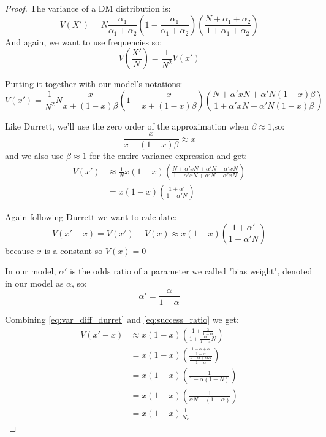 \documentclass[12pt]{extarticle}
\begin{document}
\begin{proof}
The variance of a DM distribution is:
\begin{equation}
V(X') = N\frac{\alpha_1}{\alpha_1+\alpha_2}(1-\frac{\alpha_1}{\alpha_1+\alpha_2})
(\frac{N + \alpha_1+\alpha_2}{1+\alpha_1+\alpha_2})
\end{equation}
And again, we want to use frequencies so:
\begin{equation}
V(\frac{X'}{N}) = \frac{1}{N^2}V(x')
\end{equation}

Putting it together with our model's notations:
\begin{equation}
V(x') = \frac{1}{N^2}N\frac{x}{x+(1-x)\beta}(1-\frac{x}{x+(1-x)\beta})
(\frac{N + \alpha' xN + \alpha' N(1-x)\beta}{1 + \alpha' xN + \alpha' N(1-x)\beta}) 
\end{equation}

Like Durrett, we'll use the zero order of the approximation when $\beta\approx1$,so:
\begin{equation}
\frac{x}{x + (1-x)\beta} \approx x
\end{equation}
and we also use $\beta\approx1$ for the entire variance expression and get:
\begin{equation}
\begin{split}
V(x') & \approx  \frac{1}{N} x(1-x)
(\frac{N + \alpha' xN + \alpha' N - \alpha' xN}{1 + \alpha' xN + \alpha' N - \alpha' xN})\\
&=  x(1-x)(\frac{1 + \alpha'}{1 + \alpha' N}) 
\end{split}
\end{equation}

Again following Durrett we want to calculate:
\begin{equation}\label{eq:var_diff_durret}
V(x'-x) = V(x') - V(x) \approx  x(1-x)(\frac{1 + \alpha'}{1 + \alpha' N})
\end{equation}
because $x$ is a constant so $V(x) = 0$

In our model, $\alpha'$ is the odds ratio of a parameter we called "bias weight", denoted in our model as $\alpha$, so:
\begin{equation}\label{eq:success_ratio}
\alpha' = \frac{\alpha}{1-\alpha}
\end{equation}

Combining \cref{eq:var_diff_durret} and \cref{eq:success_ratio} we get:
\begin{equation}\label{eq:const_var}
\begin{split}
V(x'-x) & \approx x(1-x)(\frac{1 + \frac{\alpha}{1-\alpha}}{1 + \frac{\alpha}{1-\alpha} N})\\
 &= x(1-x)(\frac{\frac{1-\alpha+\alpha}{1-\alpha}}{\frac{1-\alpha+\alpha N}{1-\alpha}})\\
 &= x(1-x)(\frac{1}{1- \alpha(1-N)})\\
  &= x(1-x)(\frac{1}{\alpha N + (1-\alpha)})\\
  &= x(1-x)\frac{1}{N_e}
\end{split}
\end{equation}
\end{proof}
\end{document}
